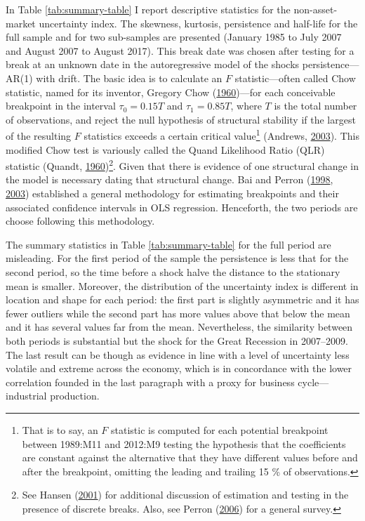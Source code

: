 \documentclass[12pt,twoside]{reedthesis}
\begin{document}
In Table \ref{tab:summary-table} I report descriptive statistics for the non-asset-market uncertainty index. The skewness, kurtosis, persistence and half-life for the full sample and for two sub-samples are presented (January 1985 to July 2007 and August 2007 to August 2017). This break date was chosen after testing for a break at an unknown date in the autoregressive model of the shocks persistence---AR(1) with drift. The basic idea is to calculate an \(F\) statistic---often called Chow statistic, named for its inventor, Gregory Chow (\protect\hyperlink{ref-chow:1960}{1960})---for each conceivable breakpoint in the interval \(\tau_{0} = 0.15T\) and \(\tau_{1} = 0.85T\), where \(T\) is the total number of observations, and reject the null hypothesis of structural stability if the largest of the resulting \(F\) statistics exceeds a certain critical value\footnote{That is to say, an \(F\) statistic is computed for each potential breakpoint between 1989:M11 and 2012:M9 testing the hypothesis that the coefficients are constant against the alternative that they have different values before and after the breakpoint, omitting the leading and trailing 15 \% of observations.} (Andrews, \protect\hyperlink{ref-andrews:2003}{2003}). This modified Chow test is variously called the Quand Likelihood Ratio (QLR) statistic (Quandt, \protect\hyperlink{ref-quandt:1960}{1960})\footnote{See Hansen (\protect\hyperlink{ref-hansen:2001}{2001}) for additional discussion of estimation and testing in the presence of discrete breaks. Also, see Perron (\protect\hyperlink{ref-perron:2006}{2006}) for a general survey.}. Given that there is evidence of one structural change in the model is necessary dating that structural change. Bai and Perron (\protect\hyperlink{ref-baiperr:1998}{1998}, \protect\hyperlink{ref-baiperr:2003}{2003}) established a general methodology for estimating breakpoints and their associated confidence intervals in OLS regression. Henceforth, the two periods are choose following this methodology.

The summary statistics in Table \ref{tab:summary-table} for the full period are misleading. For the first period of the sample the persistence is less that for the second period, so the time before a shock halve the distance to the stationary mean is smaller. Moreover, the distribution of the uncertainty index is different in location and shape for each period: the first part is slightly asymmetric and it has fewer outliers while the second part has more values above that below the mean and it has several values far from the mean. Nevertheless, the similarity between both periods is substantial but the shock for the Great Recession in 2007--2009. The last result can be though as evidence in line with a level of uncertainty less volatile and extreme across the economy, which is in concordance with the lower correlation founded in the last paragraph with a proxy for business cycle---industrial production.
\end{document}
